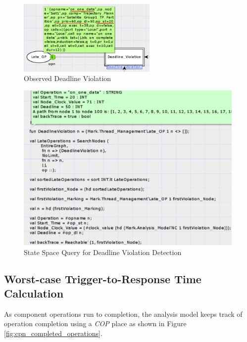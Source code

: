 \begin{figure}[ht]
\centering
\includegraphics[width=0.60\textwidth]{./figs/cpn_tpa_dv_marking}
\caption{Observed Deadline Violation}
\label{fig:cpn_tpa_dv_marking}
\vspace{-0.2in}
\end{figure}
\vspace{0.1in}

\begin{figure}[ht]
\centering
\includegraphics[width=0.99\textwidth]{./figs/cpn_tpa_dv_ss}
\caption{State Space Query for Deadline Violation Detection}
\label{fig:cpn_tpa_dv_ss}
\vspace{-0.2in}
\end{figure}

\subsection{Worst-case Trigger-to-Response Time Calculation}

As component operations run to completion, the analysis model keeps track of operation completion using a \emph{COP} place as shown in Figure \ref{fig:cpn_completed_operations}. 

